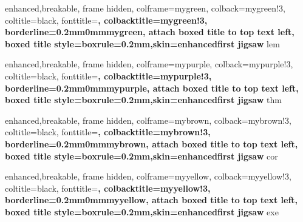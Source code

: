 {
	enhanced,breakable,
	frame hidden,
	colframe=mygreen,
	colback=mygreen!3,
	coltitle=black,
	fonttitle=\bfseries,
	colbacktitle=mygreen!3,
	borderline={0.2mm}{0mm}{mygreen},
	attach boxed title to top text left,
	boxed title style={boxrule=0.2mm,skin=enhancedfirst jigsaw}
}
{lem}

{
	enhanced,breakable,
	frame hidden,
	colframe=mypurple,
	colback=mypurple!3,
	coltitle=black,
	fonttitle=\bfseries,
	colbacktitle=mypurple!3,
	borderline={0.2mm}{0mm}{mypurple},
	attach boxed title to top text left,
	boxed title style={boxrule=0.2mm,skin=enhancedfirst jigsaw}
}
{thm}

{
	enhanced,breakable,
	frame hidden,
	colframe=mybrown,
	colback=mybrown!3,
	coltitle=black,
	fonttitle=\bfseries,
	colbacktitle=mybrown!3,
	borderline={0.2mm}{0mm}{mybrown},
	attach boxed title to top text left,
	boxed title style={boxrule=0.2mm,skin=enhancedfirst jigsaw}
}
{cor}

{
	enhanced,breakable,
	frame hidden,
	colframe=myyellow,
	colback=myyellow!3,
	coltitle=black,
	fonttitle=\bfseries,
	colbacktitle=myyellow!3,
	borderline={0.2mm}{0mm}{myyellow},
	attach boxed title to top text left,
	boxed title style={boxrule=0.2mm,skin=enhancedfirst jigsaw}
}
{exe}